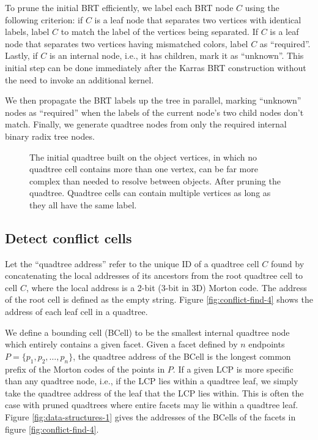 \documentclass[final,3p,times,twocolumn]{elsarticle}
\begin{document}
To prune the initial BRT efficiently, we label each BRT node $C$ using the following criterion: if $C$ is a leaf node that separates two vertices with identical labels, label $C$ to match the label of the vertices being separated. If $C$ is a leaf node that separates two vertices having mismatched colors, label $C$ as ``required''. Lastly, if $C$ is an internal node, i.e., it has children, mark it as ``unknown''. This initial step can be done immediately after the Karras BRT construction without the need to invoke an additional kernel.

We then propagate the BRT labels up the tree in parallel, marking ``unknown'' nodes as ``required'' when the labels of the current node's two child nodes don't match. Finally, we generate quadtree nodes from only the required internal binary radix tree nodes.

\begin{figure}
  \centering
  \caption{
    \protect{} The initial quadtree built on the object vertices, in which no quadtree cell contains more than one vertex, can be far more complex than needed to resolve between objects.
    \protect{} After pruning the quadtree. Quadtree cells can contain multiple vertices as long as they all have the same label.
  }
  \label{fig:pruning}
\end{figure}

\subsection{Detect conflict cells}

Let the ``quadtree address'' refer to the unique ID of a quadtree cell $C$ found by concatenating the local addresses of its ancestors from the root quadtree cell to cell $C$, where the local address is a 2-bit (3-bit in 3D) Morton code. The address of the root cell is defined as the empty string. Figure \ref{fig:conflict-find-4} shows the address of each leaf cell in a quadtree.

We define a bounding cell (BCell) to be the smallest internal quadtree node which entirely contains a given facet. Given a facet defined by $n$ endpoints $P=\{p_1, p_2, \dots, p_n\}$, the quadtree address of the BCell is the longest common prefix of the Morton codes of the points in $P$. If a given LCP is more specific than any quadtree node, i.e., if the LCP lies within a quadtree leaf, we simply take the quadtree address of the leaf that the LCP lies within. This is often the case with pruned quadtrees where entire facets may lie within a quadtree leaf. Figure \ref{fig:data-structures-1} gives the addresses of the BCells of the facets in figure \ref{fig:conflict-find-4}.
\end{document}
